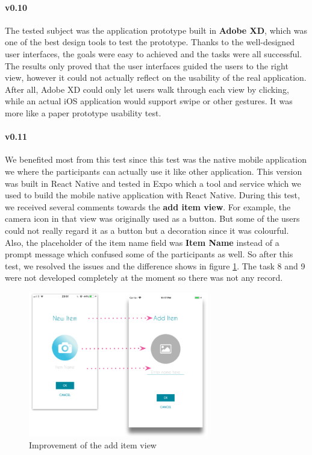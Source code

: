 \documentclass[12pt,a4paper]{article}
\begin{document}
          \paragraph{v0.10} The tested subject was the application prototype built in {\bf Adobe XD}, which was one of the best design tools to test the prototype. Thanks to the well-designed user interfaces, the goals were easy to achieved and the  tasks were all successful. The results only proved that the user interfaces guided the users to the right view, however it could not actually reflect on the usability of the real application. After all, Adobe XD could only let users walk through each view by clicking, while an actual iOS application would support swipe or other gestures. It was more like a paper prototype usability test.
          
          \paragraph{v0.11} We benefited most from this test since this test was the native mobile application we where the participants can actually use it like other application. This version was built in React Native and tested in Expo which a tool and service which we used to build the mobile native application with React Native. During this test, we received several comments towards the {\bf add item view}. For example, the camera icon in that view was originally used as a button. But some of the users could not really regard it as a button but a decoration since it was colourful. Also, the placeholder of the item name field was {\bf Item Name} instead of a prompt message which confused some of the participants as well. So after this test, we resolved the issues and the difference shows in figure \ref{fig:usability-test-ios-v010-improvements}. The task 8 and 9 were not developed completely at the moment so there was not any record.

          \begin{figure}[H]
            \centering
            \includegraphics[width=0.7\textwidth]{../assets/usability-test-ios-v010-improvements.png}
            \caption{Improvement of the add item view}
            \label{fig:usability-test-ios-v010-improvements}
          \end{figure}
\end{document}
